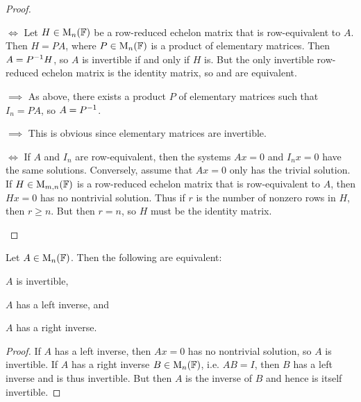 \begin{proof}
\begin{proofsec*}
    \item[\itemref{enum:lemma-A-invertible} $\iff$ \itemref{enum:lemma-A-equivalent-to-I}]
    Let $H \in \mathrm{M}_{n}(\mathbb{F})$ be a row-reduced echelon matrix that is row-equivalent to $A$. Then $H = PA$, where $P \in \mathrm{M}_{n}(\mathbb{F})$ is a product of elementary matrices. Then $A = {P}^{-1} H$, so $A$ is invertible if and only if $H$ is. But the only invertible row-reduced echelon matrix is the identity matrix, so  and  are equivalent.
    
    \item[\itemref{enum:lemma-A-equivalent-to-I} $\implies$ \itemref{enum:lemma-A-elementary-matrix-product}]
    As above, there exists a product $P$ of elementary matrices such that $I_n = PA$, so $A = {P}^{-1}$.

    \item[\itemref{enum:lemma-A-elementary-matrix-product} $\implies$ \itemref{enum:lemma-A-invertible}]
    This is obvious since elementary matrices are invertible.

    \item[\itemref{enum:lemma-A-equivalent-to-I} $\iff$ \itemref{enum:lemma-only-trivial-solution}]
    If $A$ and $I_n$ are row-equivalent, then the systems $Ax = 0$ and $I_n x = 0$ have the same solutions. Conversely, assume that $Ax = 0$ only has the trivial solution. If $H \in \mathrm{M}_{m,n}(\mathbb{F})$ is a row-reduced echelon matrix that is row-equivalent to $A$, then $Hx = 0$ has no nontrivial solution. Thus if $r$ is the number of nonzero rows in $H$, then $r \geq n$. But then $r = n$, so $H$ must be the identity matrix.
\end{proofsec*}
\end{proof}


\begin{proposition}
    Let $A \in \mathrm{M}_{n}(\mathbb{F})$. Then the following are equivalent:
    \begin{enumproposition}
        \item $A$ is invertible,
        \item $A$ has a left inverse, and
        \item $A$ has a right inverse.
    \end{enumproposition}
\end{proposition}

\begin{proof}
    If $A$ has a left inverse, then $Ax = 0$ has no nontrivial solution, so $A$ is invertible. If $A$ has a right inverse $B \in \mathrm{M}_{n}(\mathbb{F})$, i.e. $AB = I$, then $B$ has a left inverse and is thus invertible. But then $A$ is the inverse of $B$ and hence is itself invertible.
\end{proof}
